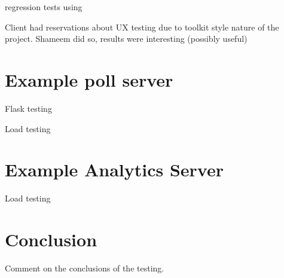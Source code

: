 regression tests using 

Client had reservations about UX testing due to toolkit style nature of the project. Shameem did so, results were interesting (possibly useful)

\section{Example poll server}

Flask testing

Load testing

\section{Example Analytics Server}

Load testing

\section{Conclusion}

Comment on the conclusions of the testing.

